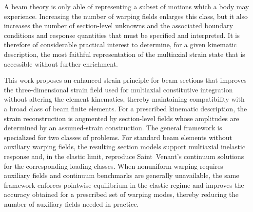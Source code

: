 \begin{description}


\end{description}

A beam theory is only able of representing a subset of motions which a body may experience. Increasing the number of warping fields enlarges this class, but it also increases the number of section-level unknowns and the associated boundary conditions and response quantities that must be specified and interpreted. 
It is therefore of considerable practical interest to determine, for a given kinematic description, the most faithful representation of the multiaxial strain state that is accessible without further enrichment. 

This work proposes an enhanced strain principle for beam sections that improves the three-dimensional strain field used for multiaxial constitutive integration without altering the element kinematics, thereby maintaining compatibility with a broad class of beam finite elements. 
For a prescribed kinematic description, the strain reconstruction is augmented by section-level fields whose amplitudes are determined by an assumed-strain construction. 
The general framework is specialized for two classes of problems. 
For standard beam elements without auxiliary warping fields, the resulting section models support multiaxial inelastic response and, in the elastic limit, reproduce Saint~Venant's continuum solutions for the corresponding loading classes. 
When nonuniform warping requires auxiliary fields and continuum benchmarks are generally unavailable, the same framework enforces pointwise equilibrium in the elastic regime and improves the accuracy obtained for a prescribed set of warping modes, thereby reducing the number of auxiliary fields needed in practice.



